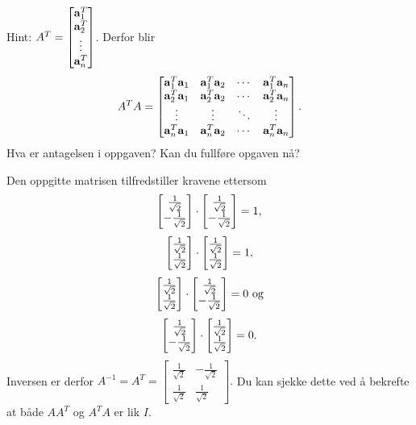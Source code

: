 \begin{losning}

\begin{punkt}
Hint: $A^T=\begin{bmatrix}
\mathbf{a}_1^T\\
\mathbf{a}_2^T\\
\vdots\\
\mathbf{a}_n^T
\end{bmatrix}$. Derfor blir
$$A^TA=\begin{bmatrix}
\mathbf{a}_1^T \mathbf{a}_1 & \mathbf{a}_1^T \mathbf{a}_2 & \cdots & \mathbf{a}_1^T\mathbf{a}_n\\
\mathbf{a}_2^T \mathbf{a}_1 & \mathbf{a}_2^T \mathbf{a}_2 & \cdots & \mathbf{a}_2^T\mathbf{a}_n\\
\vdots & \vdots & \ddots & \vdots\\
\mathbf{a}_n^T \mathbf{a}_1 & \mathbf{a}_n^T \mathbf{a}_2 & \cdots & \mathbf{a}_n^T\mathbf{a}_n
\end{bmatrix}.
$$ Hva er antagelsen i oppgaven? Kan du fullføre opgaven nå?

\end{punkt}


\begin{punkt}
Den oppgitte matrisen tilfredstiller kravene ettersom $$\begin{bmatrix} \frac{1}{\sqrt{2}} \\ -\frac{1}{\sqrt{2}} \end{bmatrix}\cdot \begin{bmatrix} \frac{1}{\sqrt{2}} \\ -\frac{1}{\sqrt{2}} \end{bmatrix}=1,$$ $$\begin{bmatrix} \frac{1}{\sqrt{2}} \\ \frac{1}{\sqrt{2}} \end{bmatrix}\cdot \begin{bmatrix} \frac{1}{\sqrt{2}} \\ \frac{1}{\sqrt{2}} \end{bmatrix}=1,$$ $$\begin{bmatrix} \frac{1}{\sqrt{2}} \\ \frac{1}{\sqrt{2}} \end{bmatrix}\cdot \begin{bmatrix} \frac{1}{\sqrt{2}} \\ -\frac{1}{\sqrt{2}} \end{bmatrix}=0 \text{ og}$$ $$\begin{bmatrix} \frac{1}{\sqrt{2}} \\ -\frac{1}{\sqrt{2}} \end{bmatrix}\cdot \begin{bmatrix} \frac{1}{\sqrt{2}} \\ \frac{1}{\sqrt{2}} \end{bmatrix}=0.$$ Inversen er derfor $A^{-1}=A^T=\begin{bmatrix}
\frac{1}{\sqrt{2}} & -\frac{1}{\sqrt{2}}\\
\frac{1}{\sqrt{2}} & \frac{1}{\sqrt{2}}
\end{bmatrix}.$ Du kan sjekke dette ved å bekrefte at både $AA^T$ og $A^TA$ er lik $I$.
\end{punkt}


\end{losning}



